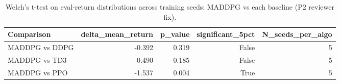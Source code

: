 \begin{table}[t]
\centering
\caption{Welch's t-test on eval-return distributions across training seeds: MADDPG vs each baseline (P2 reviewer fix).}
\label{tab:significance}
\begin{tabular}{lrrrr}
\toprule
Comparison & delta\_mean\_return & p\_value & significant\_5pct & N\_seeds\_per\_algo \\
\midrule
MADDPG vs DDPG & -0.392 & 0.319 & False & 5 \\
MADDPG vs TD3 & 0.490 & 0.185 & False & 5 \\
MADDPG vs PPO & -1.537 & 0.004 & True & 5 \\
\bottomrule
\end{tabular}

\end{table}
